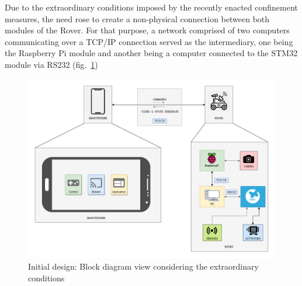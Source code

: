 Due to the extraordinary conditions imposed by the recently enacted confinement measures, the need rose to create a non-physical connection between both modules of the Rover. For that purpose, a network comprised of two computers communicating over a TCP/IP connection served as the intermediary, one being the Raspberry Pi module and another being a computer connected to the STM32 module via RS232 (fig.~\ref{fig:initial-design-2})

\begin{figure}[!ht]
\centering
\includegraphics[width=1.0\textwidth]{./sec/img/initial_design_diagram_2.png}
\caption{\label{fig:initial-design-2}Initial design: Block diagram view considering the extraordinary conditions}
\end{figure}

